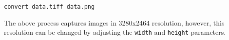 \documentclass[10pt]{article}
\begin{document}
\begin{multicols}{2}
\begin{verbatim}
convert data.tiff data.png
\end{verbatim}
The above process captures images in 3280x2464 resolution, however, this resolution can be changed by adjusting the \verb|width| and \verb|height| parameters.




































































\end{multicols}
\end{document}
